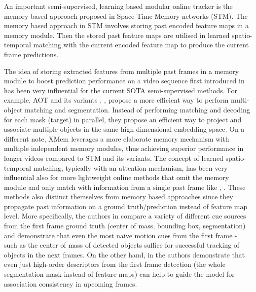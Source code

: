 An important semi-supervised, learning based modular online tracker is the memory based approach proposed in Space-Time Memory networks (STM)\parencite{stm}. The memory based approach in STM involves storing past encoded feature maps in a memory module. Then the stored past feature maps are utilised in learned spatio-temporal matching with the current encoded feature map to produce the current frame predictions. \par
The idea of storing extracted features from multiple past frames in a memory module to boost prediction performance on a video sequence first introduced in \parencite{stm} has been very influential for the current SOTA semi-supervised methods.
For example, AOT and its variants \parencite{yang2021aot}, \parencite{yang2021aost}, \parencite{yang2022deaot} propose a more efficient way to perform multi-object matching and segmentation. Instead of performing matching and decoding for each mask (target) in parallel, they propose an efficient way to project and associate multiple objects in the same high dimensional embedding space. On a different note, XMem  \parencite{cheng2022xmem} leverages a more elaborate memory mechanism with multiple independent memory modules, thus achieving superior performance in longer videos compared to STM and its variants.
\newpage
The concept of learned spatio-temporal matching, typically with an attention mechanism, has been very influential also for more lightweight online methods that omit the memory module and only match with information from a single past frame like \parencite{savi}, \parencite{athar2022hodor}. These methods also distinct themselves from memory based approaches since they propagate past information on a ground truth/prediction instead of feature map level. More specifically, the authors in \parencite{savi} compare a variety of different cue sources from the first frame ground truth (center of mass, bounding box, segmentation) and demonstrate that even the most naive motion cues from the first frame - such as the center of mass of detected objects suffice for successful tracking of objects in the next frames. 
On the other hand, in \parencite{athar2022hodor} the authors demonstrate that even just high-order descriptors from the first frame detection (the whole segmentation mask instead of feature maps) can help to guide the model for association consistency in upcoming frames. \par

